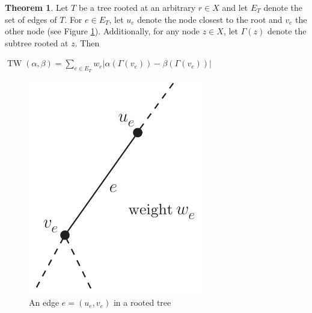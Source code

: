 \documentclass[12pt]{report}
\theoremstyle{definition}
\newtheorem{thm}[defi]{Theorem}
\theoremstyle{remark}
\DeclareMathOperator{\tw}{TW}
\begin{document}
\begin{thm}
	Let $T$ be a tree rooted at an arbitrary $r\in X$ and let $E_T$ denote the set of edges of $T$. For $e\in E_T$, let $u_e$ denote the node closest to the root and $v_e$ the other node (see Figure \ref{schematree}). Additionally, for any node $z\in X$, let $\Gamma(z)$ denote the subtree rooted at $z$. Then 
	\begin{center}
		$\displaystyle \tw(\alpha,\beta) = \sum_{e\in E_T} w_e |\alpha(\Gamma(v_e))-\beta(\Gamma(v_e))|$
	\end{center}
	\begin{figure}[h!]
	\centering
    \includegraphics[scale=0.9]{schematree.pdf}
    \caption{An edge $e=(u_e,v_e)$ in a rooted tree}
    \label{schematree}
	\end{figure}
\end{thm}
\end{document}
